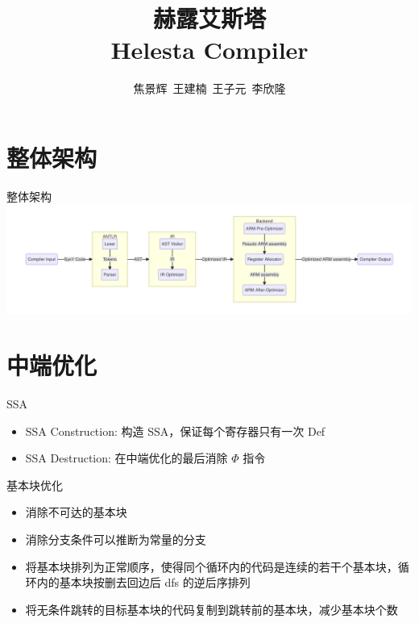 \documentclass[aspectratio=169,UTF-8]{ctexbeamer}
\title{赫露艾斯塔\\ Helesta Compiler}
\author{焦景辉\ 王建楠\ 王子元\ 李欣隆}
\institute{清华大学}
\begin{document}
	\maketitle
	
	\begin{frame}
		\tableofcontents
	\end{frame}
	
	\section{整体架构}
	
		\begin{frame}{整体架构}
			\includegraphics[width=\textwidth]{arch.png}
		\end{frame}
			
	\section{中端优化}
	
		\begin{frame}{SSA}
			\begin{itemize}
				\item SSA Construction: 构造 SSA，保证每个寄存器只有一次 Def
				\item SSA Destruction: 在中端优化的最后消除 $\Phi$ 指令
			\end{itemize}
		\end{frame}
		
		\begin{frame}{基本块优化}
			\begin{itemize}
				\item 消除不可达的基本块
				\item 消除分支条件可以推断为常量的分支
				\item 将基本块排列为正常顺序，使得同个循环内的代码是连续的若干个基本块，循环内的基本块按删去回边后 dfs 的逆后序排列
				\item 将无条件跳转的目标基本块的代码复制到跳转前的基本块，减少基本块个数
			\end{itemize}
		\end{frame}
		
\end{document}
